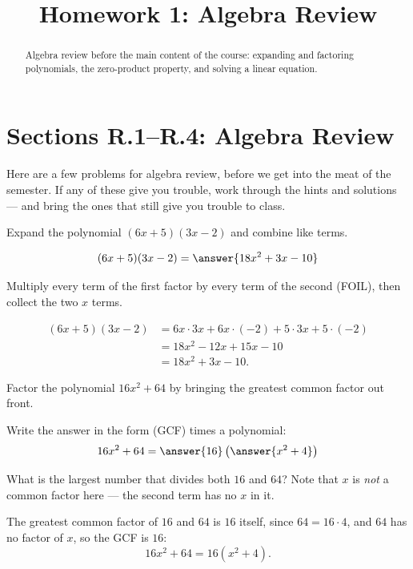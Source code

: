 \documentclass[12pt]{ximera}
\title{Homework 1: Algebra Review}
\begin{document}
\begin{abstract}
Algebra review before the main content of the course: expanding and factoring
polynomials, the zero-product property, and solving a linear equation.
\end{abstract}
\maketitle

\section*{Sections R.1--R.4: Algebra Review}

Here are a few problems for algebra review, before we get into the meat of the
semester. If any of these give you trouble, work through the hints and solutions ---
and bring the ones that still give you trouble to class.

\begin{problem}
Expand the polynomial $(6x+5)(3x-2)$ and combine like terms.

\[ (6x+5)(3x-2) = \answer{18x^2+3x-10} \]

\begin{hint}
Multiply every term of the first factor by every term of the second (FOIL), then
collect the two $x$ terms.
\end{hint}

\begin{feedback}
\begin{align*}
(6x+5)(3x-2) &= 6x\cdot 3x + 6x\cdot(-2) + 5\cdot 3x + 5\cdot(-2)\\
             &= 18x^2 - 12x + 15x - 10\\
             &= 18x^2 + 3x - 10.
\end{align*}
\end{feedback}
\end{problem}

\begin{problem}
Factor the polynomial $16x^2+64$ by bringing the greatest common factor out front.

Write the answer in the form (GCF) times a polynomial:
\[ 16x^2 + 64 = \answer{16}\left(\answer{x^2+4}\right) \]

\begin{hint}
What is the largest number that divides both $16$ and $64$? Note that $x$ is
\emph{not} a common factor here --- the second term has no $x$ in it.
\end{hint}

\begin{feedback}
The greatest common factor of $16$ and $64$ is $16$ itself, since $64=16\cdot 4$, and
$64$ has no factor of $x$, so the GCF is $16$:
\[ 16x^2 + 64 = 16\left(x^2 + 4\right). \]
\end{feedback}
\end{problem}
\end{document}
